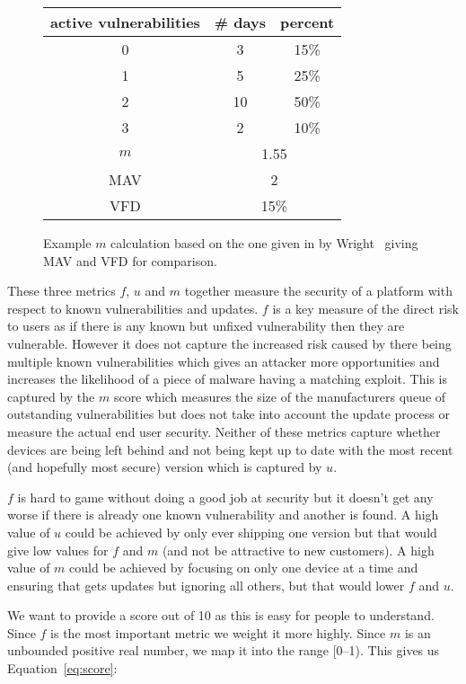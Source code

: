\begin{figure}
\centering

\begin{tabular}{c|c|c}
active vulnerabilities & \# days & percent\\
\hline
0 & 3 & 15\%\\
1 & 5 & 25\%\\
2 & 10 & 50\%\\
3 & 2 & 10\%\\
\hline
\hline
$m$ & \multicolumn{2}{c}{1.55}\\
MAV & \multicolumn{2}{c}{2}\\
VFD & \multicolumn{2}{c}{15\%}\\

\end{tabular}
\caption{Example $m$ calculation based on the one given in by Wright~\cite{Wright2014} giving MAV and VFD for comparison.}
\label{fig:mcalculation}
\end{figure}

These three metrics $f$, $u$ and $m$ together measure the security of a platform with respect to known vulnerabilities and updates.
$f$ is a key measure of the direct risk to users as if there is any known but unfixed vulnerability then they are vulnerable.
However it does not capture the increased risk caused by there being multiple known vulnerabilities which gives an attacker more opportunities and increases the likelihood of a piece of malware having a matching exploit.
This is captured by the $m$ score which measures the size of the manufacturers queue of outstanding vulnerabilities but does not take into account the update process or measure the actual end user security.
Neither of these metrics capture whether devices are being left behind and not being kept up to date with the most recent (and hopefully most secure) version which is captured by $u$.

$f$ is hard to game without doing a good job at security but it doesn't get any worse if there is already one known vulnerability and another is found.
A high value of $u$ could be achieved by only ever shipping one version but that would give low values for $f$ and $m$ (and not be attractive to new customers).
A high value of $m$ could be achieved by focusing on only one device at a time and ensuring that gets updates but ignoring all others, but that would lower $f$ and $u$.

We want to provide a score out of 10 as this is easy for people to understand.
Since $f$ is the most important metric we weight it more highly.
Since $m$ is an unbounded positive real number, we map it into the range [0--1).
This gives us Equation~\ref{eq:score}:

